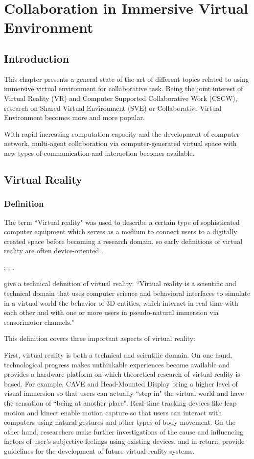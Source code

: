 \chapter{Collaboration in Immersive Virtual Environment}
\label{chapter:context}
\minitoc

\section{Introduction}
This chapter presents a general state of the art of different topics related to using immersive virtual environment for collaborative task. Being the joint interest of Virtual Reality (VR) and Computer Supported Collaborative Work (CSCW), research on Shared Virtual Environment (SVE) or Collaborative Virtual Environment becomes more and more popular.

With rapid increasing computation capacity and the development of computer network, multi-agent collaboration via computer-generated virtual space with new types of communication and interaction becomes available.

\section{Virtual Reality}
\subsection{Definition}
The term ``Virtual reality" was used to describe a certain type of sophisticated computer equipment which serves as a medium to connect users to a digitally created space before becoming a research domain, so early definitions of virtual reality are often device-oriented \citep{Steuer1995Defining}. 

\citep{Lanier1992VR}; \citep{Rheingold1991VR}; \citep{Sutherland1968Hmd}.



\citet{Fuchs2011Book} give a technical definition of virtual reality: ``Virtual reality is a scientific and technical domain that uses computer science and behavioral interfaces to simulate in a virtual world the behavior of 3D entities, which interact in real time with each other and with one or more users in pseudo-natural immersion via sensorimotor channels."

This definition covers three important aspects of virtual reality:

First, virtual reality is both a technical and scientific domain. On one hand, technological progress makes unthinkable experiences become available and provides a hardware platform on which theoretical research of virtual reality is based. For example, CAVE and Head-Mounted Display bring a higher level of visual immersion so that users can actually ``step in" the virtual world and have the sensation of ``being at another place". Real-time tracking devices like leap motion and kinect enable motion capture so that users can interact with computers using natural gestures and other types of body movement. On the other hand, researchers make further investigations of the cause and influencing factors of user's subjective feelings using existing devices, and in return, provide guidelines for the development of future virtual reality systems.

